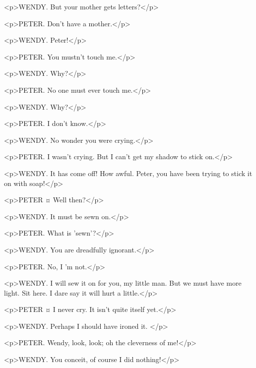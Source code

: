 <p>WENDY. But your mother gets letters?</p>

<p>PETER. Don't have a mother.</p>

<p>WENDY. Peter!</p>


<p>PETER. You mustn't touch me.</p>

<p>WENDY. Why?</p>

<p>PETER. No one must ever touch me.</p>

<p>WENDY. Why?</p>

<p>PETER. I don't know.</p>


<p>WENDY. No wonder you were crying.</p>

<p>PETER. I wasn't crying. But I can't get my shadow to stick on.</p>

<p>WENDY. It has come off! How awful.
Peter, you have been trying to stick it on with soap!</p>

<p>PETER ¤
Well then?</p>

<p>WENDY. It must be sewn on.</p>

<p>PETER. What is 'sewn'?</p>

<p>WENDY. You are dreadfully ignorant.</p>

<p>PETER. No, I 'm not.</p>

<p>WENDY. I will sew it on for you, my little man. But we must have more light.
Sit here. I dare say it will hurt a little.</p>

<p>PETER ¤
I never cry.
It isn't quite itself yet.</p>

<p>WENDY. Perhaps I should have ironed it.
</p>

<p>PETER. Wendy, look, look; oh the cleverness of me!</p>

<p>WENDY. You conceit, of course I did nothing!</p>


